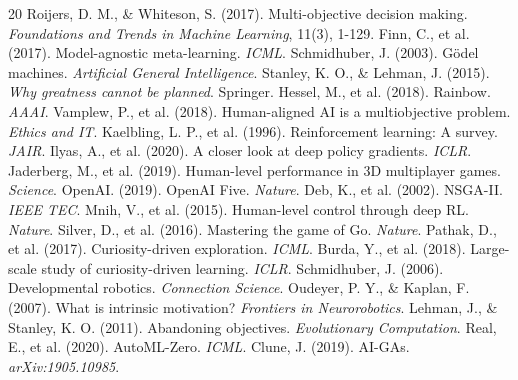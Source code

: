 \documentclass[11pt]{article}
\begin{document}

\begin{thebibliography}{20}
 Roijers, D. M., \& Whiteson, S. (2017). Multi-objective decision making. \textit{Foundations and Trends in Machine Learning}, 11(3), 1-129.
 Finn, C., et al. (2017). Model-agnostic meta-learning. \textit{ICML}.
 Schmidhuber, J. (2003). G{\"o}del machines. \textit{Artificial General Intelligence}.
 Stanley, K. O., \& Lehman, J. (2015). \textit{Why greatness cannot be planned}. Springer.
 Hessel, M., et al. (2018). Rainbow. \textit{AAAI}.
 Vamplew, P., et al. (2018). Human-aligned AI is a multiobjective problem. \textit{Ethics and IT}.
 Kaelbling, L. P., et al. (1996). Reinforcement learning: A survey. \textit{JAIR}.
 Ilyas, A., et al. (2020). A closer look at deep policy gradients. \textit{ICLR}.
 Jaderberg, M., et al. (2019). Human-level performance in 3D multiplayer games. \textit{Science}.
 OpenAI. (2019). OpenAI Five. \textit{Nature}.
 Deb, K., et al. (2002). NSGA-II. \textit{IEEE TEC}.
 Mnih, V., et al. (2015). Human-level control through deep RL. \textit{Nature}.
 Silver, D., et al. (2016). Mastering the game of Go. \textit{Nature}.
 Pathak, D., et al. (2017). Curiosity-driven exploration. \textit{ICML}.
 Burda, Y., et al. (2018). Large-scale study of curiosity-driven learning. \textit{ICLR}.
 Schmidhuber, J. (2006). Developmental robotics. \textit{Connection Science}.
 Oudeyer, P. Y., \& Kaplan, F. (2007). What is intrinsic motivation? \textit{Frontiers in Neurorobotics}.
 Lehman, J., \& Stanley, K. O. (2011). Abandoning objectives. \textit{Evolutionary Computation}.
 Real, E., et al. (2020). AutoML-Zero. \textit{ICML}.
 Clune, J. (2019). AI-GAs. \textit{arXiv:1905.10985}.
\end{thebibliography}
\end{document}

